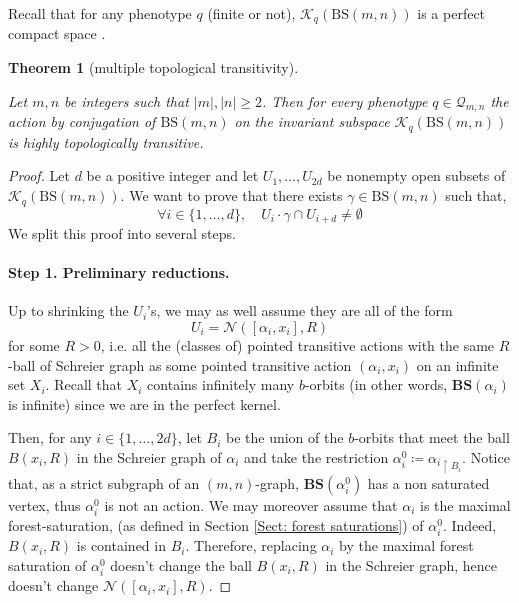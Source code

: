 \documentclass[12pt]{article}
\numberwithin{equation}{section}
\newtheorem{theorem}[equation]{Theorem}
\theoremstyle{definition}
\newcommand{\abs}[1]{\left\lvert #1\right\rvert}
\newcommand{\Nc}{\mathcal{N}}
\newcommand{\PK}{\mathcal{K}}
\newcommand{\QQ}{\mathcal{Q}}
\newcommand\BSo{\mathrm{BS}}
\newcommand\BSe{\mathbf{BS}}
\begin{document}
Recall that for any phenotype $q$ (finite or not), \( \PK_q(\BSo(m,n))  \) is a perfect compact space \cite[Remark 5.12]{CGLMS-22}.

\begin{theorem}[multiple topological transitivity]
	\label{thm: multiple topological transitivity}
	
	Let \( m,n \) be integers such that ${\abs m}, \abs n\geq 2$. Then for every phenotype $q\in \QQ_{m,n}$ the action by conjugation of \( \BSo(m,n)  \) on the invariant subspace \( \PK_q(\BSo(m,n))  \) is highly topologically transitive.
\end{theorem}



\begin{proof}
    	Let \( d \) be a positive integer and let $U_1,\dots, U_{2d}$ be nonempty open subsets of \( \PK_q(\BSo(m,n))  \).
	We want to prove that there exists $\gamma \in \BSo(m,n)$ such that,
	\[
		\forall i\in\{1,\dots,d\}, \quad U_i\cdot \gamma\cap U_{i+d}\neq\emptyset
	\]
	We split this proof into several steps.
	
	\paragraph{Step 1. Preliminary reductions.}	
	Up to shrinking the $U_i$'s, we may as well assume they are all of the form
	\[
		U_i=\Nc([\alpha_i,x_i],R)
	\]
	for some $R>0$, 
	i.e. all the (classes of) pointed transitive actions with the same $R$-ball of Schreier graph as some pointed transitive action $(\alpha_i, x_i)$ on an infinite set $X_i$.
	Recall that $X_i$ contains infinitely many \( b \)-orbits 
	(in other words, $\BSe(\alpha_i)$ is infinite)
	since we are in the perfect kernel.
	
	Then, for any $i\in\{1,\dots, 2d\}$, 
	let $B_i$ be the union of the \( b \)-orbits that meet the ball $B(x_i, R)$ in the Schreier graph of $\alpha_i$ 
	and take the restriction $\alpha_i^0 \coloneqq {\alpha_i}_{\restriction B_i}$.
	Notice that, as a strict subgraph of an $(m,n)$-graph, $\BSe(\alpha_i^0)$ has a non saturated vertex, thus $\alpha_i^0$ is not an action.
	We may moreover assume that 
	$\alpha_i$ is the maximal forest-saturation,
	(as defined in Section \ref{Sect: forest saturations}) of $\alpha_i^0$.
	Indeed, $B(x_i, R)$ is contained in $B_i$. 
	Therefore, replacing $\alpha_i$ by the maximal forest saturation of $\alpha_i^0$
	doesn't change the ball $B(x_i, R)$ in the Schreier graph, 
	hence doesn't change $\Nc([\alpha_i,x_i],R)$.


\end{proof}
\end{document}
